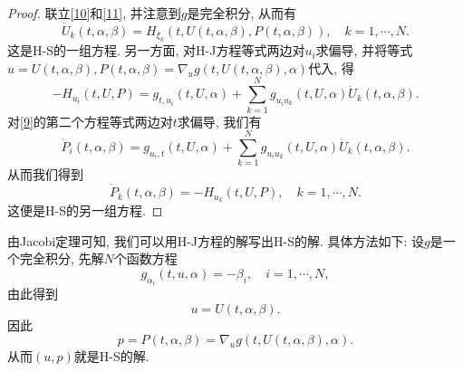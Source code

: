 \begin{theorem}[Jacobi]
\begin{proof}
        联立\eqref{10}和\eqref{11}, 并注意到$g$是完全积分, 从而有 
        \begin{equation*}
            \dot U_k(t, \alpha, \beta) =H_{\xi_k}(t, U(t, \alpha, \beta), P(t, \alpha, \beta)), \quad k = 1, \cdots, N.
        \end{equation*}
        这是H-S的一组方程. 另一方面, 对H-J方程等式两边对$u_i$求偏导, 并将等式$u = U(t, \alpha, \beta), P(t, \alpha, \beta) = \nabla_ug(t, U(t, \alpha, \beta), \alpha)$代入, 得 
        \begin{equation*}
            -H_{u_i}(t, U, P) = g_{t, u_i}(t, U, \alpha) + \sum_{k = 1}^Ng_{u_iu_k}(t, U, \alpha)\dot U_k(t, \alpha, \beta).
        \end{equation*}
        对\eqref{9}的第二个方程等式两边对$t$求偏导, 我们有 
        \begin{equation*}
            \dot P_i(t, \alpha, \beta) = g_{u_i, t}(t, U, \alpha) + \sum_{k = 1}^Ng_{u_iu_k}(t, U, \alpha)\dot U_k(t, \alpha, \beta).
        \end{equation*}
        从而我们得到 
        \begin{equation*}
            \dot P_k(t, \alpha, \beta) = -H_{u_k}(t, U, P), \quad k = 1, \cdots, N.
        \end{equation*}
        这便是H-S的另一组方程.
    \end{proof}
\end{theorem}

由Jacobi定理可知, 我们可以用H-J方程的解写出H-S的解. 具体方法如下: 设$g$是一个完全积分, 先解$N$个函数方程 
\begin{equation*}
    g_{\alpha_i}(t, u, \alpha) = -\beta_i, \quad i = 1, \cdots, N,
\end{equation*}
由此得到 
\begin{equation}\label{12}
    u = U(t, \alpha, \beta). 
\end{equation}
因此
\begin{equation}\label{13}
    p = P(t, \alpha, \beta) = \nabla_ug(t, U(t, \alpha, \beta), \alpha).
\end{equation}
从而$(u, p)$就是H-S的解.


